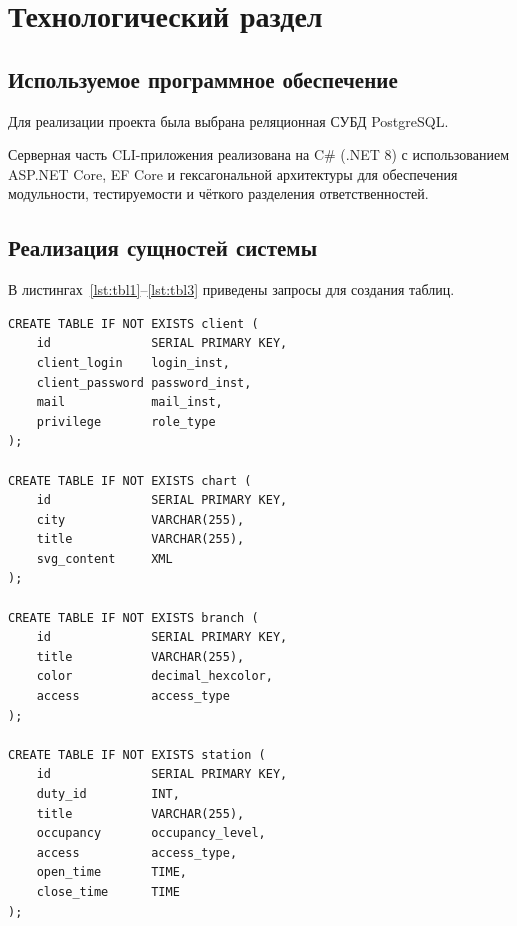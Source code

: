 \chapter{Технологический раздел}

\section{Используемое программное обеспечение}
Для реализации проекта была выбрана реляционная СУБД PostgreSQL.

Серверная часть CLI-приложения реализована на C\# (.NET 8) с использованием ASP.NET Core, EF Core и гексагональной архитектуры для обеспечения модульности, тестируемости и чёткого разделения ответственностей.

\section{Реализация сущностей системы}
В листингах~\ref{lst:tbl1}--\ref{lst:tbl3} приведены запросы для создания таблиц.

\begin{lstlisting}[label=lst:tbl1,caption=Запросы для создания таблиц (часть 1)]
CREATE TABLE IF NOT EXISTS client (
	id              SERIAL PRIMARY KEY,
	client_login    login_inst,
	client_password password_inst,
	mail            mail_inst,
	privilege       role_type
);

CREATE TABLE IF NOT EXISTS chart (
	id              SERIAL PRIMARY KEY,
	city            VARCHAR(255),
	title           VARCHAR(255),
	svg_content     XML
);

CREATE TABLE IF NOT EXISTS branch (
	id              SERIAL PRIMARY KEY,
	title           VARCHAR(255),
	color           decimal_hexcolor,
	access          access_type
);

CREATE TABLE IF NOT EXISTS station (
	id              SERIAL PRIMARY KEY,
	duty_id         INT,
	title           VARCHAR(255),
	occupancy       occupancy_level,
	access          access_type,
	open_time       TIME,
	close_time      TIME
);
\end{lstlisting}

\clearpage

